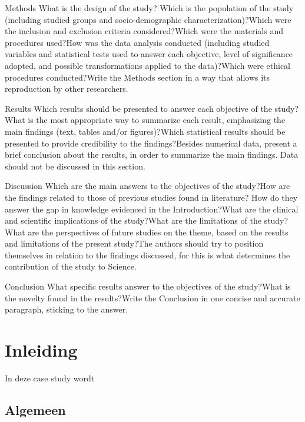 \documentclass{article}
\begin{document}
Methods
What is the design of the study? Which is the population of the study (including studied groups and socio-demographic characterization)?Which were the inclusion and exclusion criteria considered?Which were the materials and procedures used?How was the data analysis conducted (including studied variables and statistical tests used to answer each objective, level of significance adopted, and possible transformations applied to the data)?Which were ethical procedures conducted?Write the Methods section in a way that allows its reproduction by other researchers. 

Results
Which  results  should  be  presented  to  answer  each  objective  of  the study?What  is  the  most  appropriate  way  to  summarize  each  result,  emphasizing the main findings (text, tables and/or figures)?Which statistical results should be presented to provide credibility to the findings?Besides  numerical  data,  present  a  brief  conclusion  about  the  results, in order to summarize the main findings. Data should not be discussed in this section.

Discussion
Which are the main answers to the objectives of the study?How are the findings related to those of previous studies found in literature? How do they answer the gap in knowledge evidenced in the Introduction?What are the clinical and scientific implications of the study?What are the limitations of the study?What are the perspectives of future studies on the theme, based on the results and limitations of the present study?The  authors  should  try  to  position  themselves  in  relation  to  the  findings discussed, for this is what determines the contribution of the study to Science.

Conclusion
What specific results answer to the objectives of the study?What is the novelty found in the results?Write  the  Conclusion  in  one  concise  and  accurate  paragraph,  sticking to the answer. 



	\newpage
	\tableofcontents
	
	\newpage
	\section{Inleiding}
	In deze case study wordt %
	
		\subsection{Algemeen}
	
\end{document}
